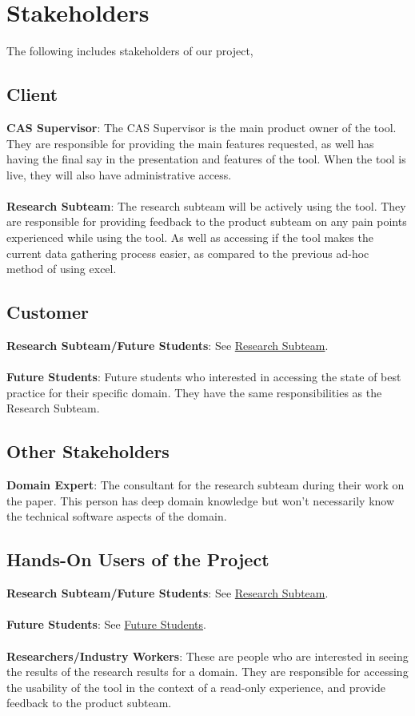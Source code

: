 \documentclass[12pt]{article}
\begin{document}
\section{Stakeholders}
The following includes stakeholders of our project, 
\subsection{Client}
\textbf{CAS Supervisor}: The CAS Supervisor is the main product owner of the tool. They are responsible for providing the main features requested, as well has having the final say in the presentation and features of the tool. When the tool is live, they will also have administrative access.
\\\\\textbf{Research Subteam}\label{research_subteam_client}: The research subteam will be actively using the tool. They are responsible for providing feedback to the product subteam on any pain points experienced while using the tool.
As well as accessing if the tool makes the current data gathering process easier, as compared to the previous ad-hoc method of using excel.
\subsection{Customer}
\textbf{Research Subteam/Future Students}: See \hyperref[research_subteam_client]{Research Subteam}.\\
\\\textbf{Future Students}\label{future_students}: Future students who interested in accessing the state of best practice for their specific domain. They have the same responsibilities as the Research Subteam.
\subsection{Other Stakeholders}
\textbf{Domain Expert}: The consultant for the research subteam during their work on the paper. This person has deep domain knowledge but won't necessarily know the technical software aspects of the domain.
\subsection{Hands-On Users of the Project}
\textbf{Research Subteam/Future Students}: See \hyperref[research_subteam_client]{Research Subteam}.\\\\
\textbf{Future Students}: See \hyperref[future_students]{Future Students}.\\\\
\textbf{Researchers/Industry Workers}: These are people who are interested in seeing the results of the research results for a domain. They are responsible for accessing the usability of the tool in the context of a read-only experience, and provide feedback to the product subteam.
\end{document}
